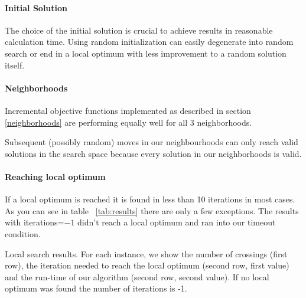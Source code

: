 \documentclass{scrartcl}
\begin{document}
\paragraph{Initial Solution}
The choice of the initial solution is crucial to achieve results in reasonable calculation time.
Using random initialization can easily degenerate into random search or end in a 
local optimum with less improvement to a random solution itself.








\paragraph{Neighborhoods}
Incremental objective functions implemented as described in section \ref{neighborhoods}
are performing equally well for all 3 neighborhoods.

Subsequent (possibly random) moves in our neighbourhoods can only reach
valid solutions in the search space because every solution in our neighborhoods
is valid.

\paragraph{Reaching local optimum}
If a local optimum is reached it is found in less than 10 iterations in most cases.
As you can see in table ~\ref{tab:results} there are only a few exceptions.
The results with iterations=$-1$ didn't reach a local optimum and ran into our
timeout condition.








\begin{landscape}
\begin{table}
  \scriptsize
  
\caption{Local search results. For each instance, we show the number of crossings (first row), the iteration 
needed to reach the local optimum (second row, first value) and the run-time of our algorithm (second row, second value).
If no local optimum was found the number of iterations is -1. }
\label{tab:results}
\end{table}
\end{landscape}
\end{document}

